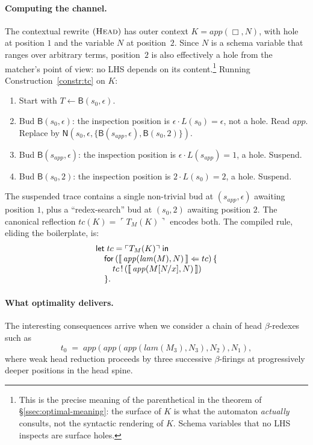 \documentclass[11pt]{article}
\theoremstyle{plain}
\theoremstyle{definition}
\theoremstyle{remark}
\newcommand{\sem}[1]{\llbracket\,#1\,\rrbracket}
\newcommand{\reflect}[1]{\ulcorner #1 \urcorner}
\newcommand{\Send}[2]{#1 \,!\, (#2)}
\begin{document}
\paragraph{Computing the channel.}
The contextual rewrite $(\textsc{Head})$ has outer context
$K = \mathit{app}(\Box, N)$, with hole at position $1$ and the variable
$N$ at position~$2$. Since $N$ is a schema variable that ranges over
arbitrary terms, position~$2$ is also effectively a hole from the
matcher's point of view: no LHS depends on its content.\footnote{This
is the precise meaning of the parenthetical in the theorem of
\S\ref{ssec:optimal-meaning}: the surface of $K$ is what the automaton
\emph{actually} consults, not the syntactic rendering of $K$. Schema
variables that no LHS inspects are surface holes.}
Running Construction~\ref{constr:tc} on $K$:
\begin{enumerate}[leftmargin=2em,label=\arabic*.]
  \item Start with $T \gets \mathsf{B}(s_{0}, \epsilon)$.
  \item Bud $\mathsf{B}(s_{0}, \epsilon)$: the inspection position is
        $\epsilon \cdot L(s_{0}) = \epsilon$, not a hole. Read
        $\mathit{app}$. Replace by
        $\mathsf{N}(s_{0}, \epsilon, \{\mathsf{B}(s_{\mathit{app}},
        \epsilon), \mathsf{B}(s_{0}, 2)\})$.
  \item Bud $\mathsf{B}(s_{\mathit{app}}, \epsilon)$: the inspection
        position is $\epsilon \cdot L(s_{\mathit{app}}) = 1$, a hole.
        Suspend.
  \item Bud $\mathsf{B}(s_{0}, 2)$: the inspection position is $2 \cdot
        L(s_{0}) = 2$, a hole. Suspend.
\end{enumerate}
The suspended trace contains a single non-trivial bud at
$(s_{\mathit{app}}, \epsilon)$ awaiting position $1$, plus a
``redex-search'' bud at $(s_{0}, 2)$ awaiting position $2$. The
canonical reflection $tc(K) = \reflect{T_{M}(K)}$ encodes both. The
compiled rule, eliding the boilerplate, is:
\[
\begin{array}{@{}l@{}}
  \mathsf{let}\;tc = \reflect{T_{M}(K)}\;\mathsf{in} \\
  \quad \mathsf{for}\,(\sem{\mathit{app}(\mathit{lam}(M), N)} \Leftarrow tc)\,\{ \\
  \quad\quad \Send{tc}{\sem{\mathit{app}(M[N/x], N)}} \\
  \quad \}.
\end{array}
\]

\paragraph{What optimality delivers.}
The interesting consequences arrive when we consider a chain of head
$\beta$-redexes such as
\[
  t_{0} \;=\; \mathit{app}(\mathit{app}(\mathit{app}(\mathit{lam}(M_{3}),
              N_{3}), N_{2}), N_{1}),
\]
where weak head reduction proceeds by three successive $\beta$-firings
at progressively deeper positions in the head spine.
\end{document}
